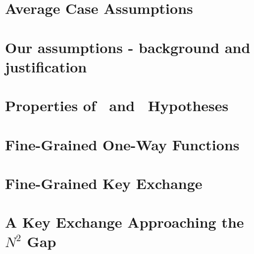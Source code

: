 \section{Average Case Assumptions}\label{sec:averageCaseAssumptions}


\section{Our assumptions - background and justification}\label{sec:justifyAssumptions}


\section{Properties of \kSum~and \zkclique~Hypotheses}\label{sec:kcliqueksumAllTHeThings}

%

\section{Fine-Grained One-Way Functions}\label{sec:fg-owfs}


\section{Fine-Grained Key Exchange}\label{sec:FineGrainedKeyExchange}



\section{A Key Exchange Approaching the $N^2$ Gap}\label{sec:n2-gap-keyxc}







